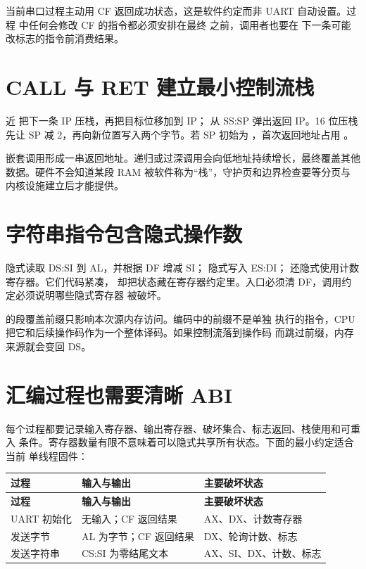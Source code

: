 当前串口过程主动用 CF 返回成功状态，这是软件约定而非 UART 自动设置。过程
中任何会修改 CF 的指令都必须安排在最终  之前，调用者也要在
下一条可能改标志的指令前消费结果。

\section{CALL 与 RET 建立最小控制流栈}

近  把下一条 IP 压栈，再把目标位移加到 IP； 从
SS:SP 弹出返回 IP。16 位压栈先让 SP 减 2，再向新位置写入两个字节。若
SP 初始为 ，首次返回地址占用 。

嵌套调用形成一串返回地址。递归或过深调用会向低地址持续增长，最终覆盖其他
数据。硬件不会知道某段 RAM 被软件称为“栈”，守护页和边界检查要等分页与
内核设施建立后才能提供。

\section{字符串指令包含隐式操作数}

 隐式读取 DS:SI 到 AL，并根据 DF 增减 SI；
隐式写入 ES:DI； 还隐式使用计数寄存器。它们代码紧凑，
却把状态藏在寄存器约定里。入口必须清 DF，调用约定必须说明哪些隐式寄存器
被破坏。

 的段覆盖前缀只影响本次源内存访问。编码中的前缀不是单独
执行的指令，CPU 把它和后续操作码作为一个整体译码。如果控制流落到操作码
而跳过前缀，内存来源就会变回 DS。

\section{汇编过程也需要清晰 ABI}

每个过程都要记录输入寄存器、输出寄存器、破坏集合、标志返回、栈使用和可重入
条件。寄存器数量有限不意味着可以隐式共享所有状态。下面的最小约定适合当前
单线程固件：

\begin{longtable}{L{0.19\textwidth}L{0.31\textwidth}L{0.38\textwidth}}
\toprule
\textbf{过程} & \textbf{输入与输出} & \textbf{主要破坏状态}\\
\midrule
\endfirsthead
\toprule
\textbf{过程} & \textbf{输入与输出} & \textbf{主要破坏状态}\\
\midrule
\endhead
UART 初始化 & 无输入；CF 返回结果 & AX、DX、计数寄存器\\
发送字节 & AL 为字节；CF 返回结果 & DX、轮询计数、标志\\
发送字符串 & CS:SI 为零结尾文本 & AX、SI、DX、计数、标志\\
\bottomrule
\end{longtable}

